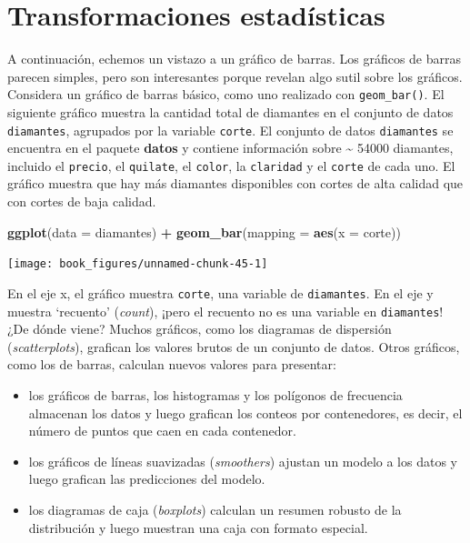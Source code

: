 \documentclass[11pt,oneside]{report}
\newenvironment{Shaded}{\begin{snugshade}}{\end{snugshade}}
\newcommand{\DataTypeTok}[1]{\textcolor[rgb]{0.13,0.29,0.53}{#1}}
\newcommand{\KeywordTok}[1]{\textcolor[rgb]{0.13,0.29,0.53}{\textbf{#1}}}
\newcommand{\NormalTok}[1]{#1}
\newcommand{\OperatorTok}[1]{\textcolor[rgb]{0.81,0.36,0.00}{\textbf{#1}}}
\newcommand{\StringTok}[1]{\textcolor[rgb]{0.31,0.60,0.02}{#1}}
\begin{document}
\hypertarget{transformaciones-estaduxedsticas}{%
\section{Transformaciones
estadísticas}\label{transformaciones-estaduxedsticas}}

A continuación, echemos un vistazo a un gráfico de barras. Los gráficos
de barras parecen simples, pero son interesantes porque revelan algo
sutil sobre los gráficos. Considera un gráfico de barras básico, como
uno realizado con \texttt{geom\_bar()}. El siguiente gráfico muestra la
cantidad total de diamantes en el conjunto de datos \texttt{diamantes},
agrupados por la variable \texttt{corte}. El conjunto de datos
\texttt{diamantes} se encuentra en el paquete \textbf{datos} y contiene
información sobre \textasciitilde{} 54000 diamantes, incluido el
\texttt{precio}, el \texttt{quilate}, el \texttt{color}, la
\texttt{claridad} y el \texttt{corte} de cada uno. El gráfico muestra
que hay más diamantes disponibles con cortes de alta calidad que con
cortes de baja calidad.

\begin{Shaded}
\begin{Highlighting}[]
\KeywordTok{ggplot}\NormalTok{(}\DataTypeTok{data =}\NormalTok{ diamantes) }\OperatorTok{+}
\StringTok{  }\KeywordTok{geom_bar}\NormalTok{(}\DataTypeTok{mapping =} \KeywordTok{aes}\NormalTok{(}\DataTypeTok{x =}\NormalTok{ corte))}
\end{Highlighting}
\end{Shaded}

\begin{center}\texttt{[image: book\_figures/unnamed-chunk-45-1]} \end{center}

En el eje x, el gráfico muestra \texttt{corte}, una variable de
\texttt{diamantes}. En el eje y muestra `recuento' (\emph{count}), ¡pero
el recuento no es una variable en \texttt{diamantes}! ¿De dónde viene?
Muchos gráficos, como los diagramas de dispersión (\emph{scatterplots}),
grafican los valores brutos de un conjunto de datos. Otros gráficos,
como los de barras, calculan nuevos valores para presentar:

\begin{itemize}
\item
  los gráficos de barras, los histogramas y los polígonos de frecuencia
  almacenan los datos y luego grafican los conteos por contenedores, es
  decir, el número de puntos que caen en cada contenedor.
\item
  los gráficos de líneas suavizadas (\emph{smoothers}) ajustan un modelo
  a los datos y luego grafican las predicciones del modelo.
\item
  los diagramas de caja (\emph{boxplots}) calculan un resumen robusto de
  la distribución y luego muestran una caja con formato especial.
\end{itemize}
\end{document}
